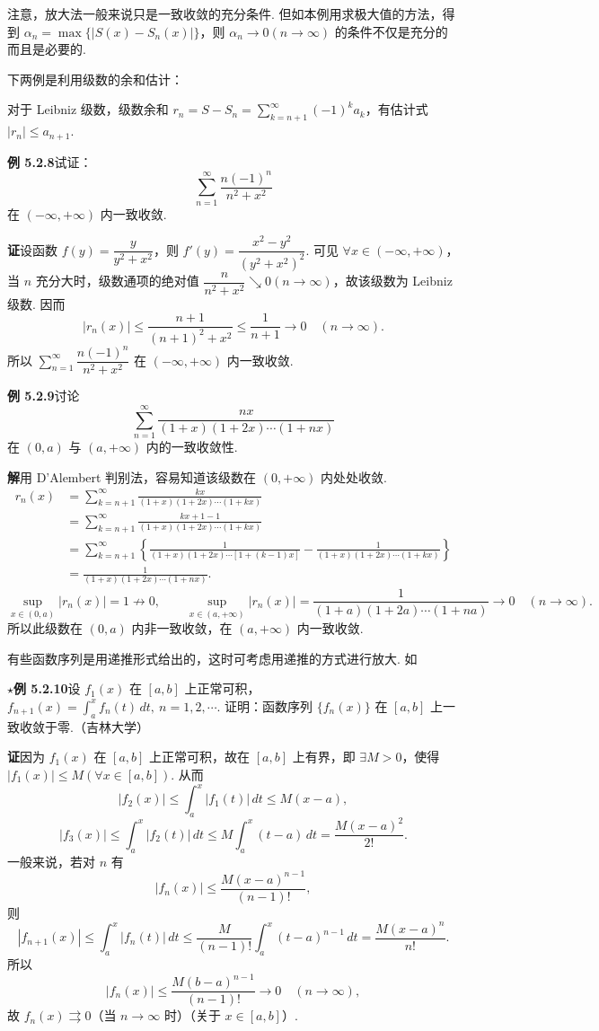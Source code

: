 \documentclass[UTF8,12pt,a4paper,fontset=fandol]{ctexart}
\begin{document}
注意，放大法一般来说只是一致收敛的充分条件. 但如本例用求极大值的方法，得到
$\alpha_n=\max\{|S(x)-S_n(x)|\}$，则 $\alpha_n\to0(n\to\infty)$ 的条件不仅是充分的而且是必要的.

下两例是利用级数的余和估计：

对于 Leibniz 级数，级数余和
$r_n=S-S_n=\displaystyle\sum_{k=n+1}^{\infty}(-1)^ka_k$，有估计式
$|r_n|\le a_{n+1}$.

\noindent\textbf{例 5.2.8}\quad 试证：
\[
  \sum_{n=1}^{\infty}\frac{n(-1)^n}{n^2+x^2}
\]
在 $(-\infty,+\infty)$ 内一致收敛.

\noindent\textbf{证}\quad 设函数 $f(y)=\dfrac{y}{y^2+x^2}$，则
$f'(y)=\dfrac{x^2-y^2}{(y^2+x^2)^2}$. 可见 $\forall x\in(-\infty,+\infty)$，当 $n$ 充分大时，级数通项的绝对值
$\dfrac{n}{n^2+x^2}\searrow0(n\to\infty)$，故该级数为 Leibniz 级数. 因而
\[
  |r_n(x)|\le\frac{n+1}{(n+1)^2+x^2}\le\frac1{n+1}\to0\quad(n\to\infty).
\]
所以 $\displaystyle\sum_{n=1}^{\infty}\dfrac{n(-1)^n}{n^2+x^2}$ 在
$(-\infty,+\infty)$ 内一致收敛.

\noindent\textbf{例 5.2.9}\quad 讨论
\[
  \sum_{n=1}^{\infty}\frac{nx}{(1+x)(1+2x)\cdots(1+nx)}
\]
在 $(0,a)$ 与 $(a,+\infty)$ 内的一致收敛性.

\noindent\textbf{解}\quad 用 D'Alembert 判别法，容易知道该级数在 $(0,+\infty)$ 内处处收敛.
\[
\begin{aligned}
r_n(x)
&=\sum_{k=n+1}^{\infty}\frac{kx}{(1+x)(1+2x)\cdots(1+kx)}\\
&=\sum_{k=n+1}^{\infty}\frac{kx+1-1}{(1+x)(1+2x)\cdots(1+kx)}\\
&=\sum_{k=n+1}^{\infty}\left\{
\frac1{(1+x)(1+2x)\cdots[1+(k-1)x]}
-\frac1{(1+x)(1+2x)\cdots(1+kx)}
\right\}\\
&=\frac1{(1+x)(1+2x)\cdots(1+nx)}.
\end{aligned}
\]
\[
  \sup_{x\in(0,a)}|r_n(x)|=1\not\to0,\qquad
  \sup_{x\in(a,+\infty)}|r_n(x)|
  =\frac1{(1+a)(1+2a)\cdots(1+na)}\to0\quad(n\to\infty).
\]
所以此级数在 $(0,a)$ 内非一致收敛，在 $(a,+\infty)$ 内一致收敛.

有些函数序列是用递推形式给出的，这时可考虑用递推的方式进行放大. 如

\noindent\textbf{$\star$例 5.2.10}\quad 设 $f_1(x)$ 在 $[a,b]$ 上正常可积，
$f_{n+1}(x)=\displaystyle\int_a^x f_n(t)\,dt,\ n=1,2,\cdots$. 证明：函数序列
$\{f_n(x)\}$ 在 $[a,b]$ 上一致收敛于零.（吉林大学）

\noindent\textbf{证}\quad 因为 $f_1(x)$ 在 $[a,b]$ 上正常可积，故在 $[a,b]$ 上有界，即
$\exists M>0$，使得 $|f_1(x)|\le M(\forall x\in[a,b])$. 从而
\[
  |f_2(x)|\le\int_a^x|f_1(t)|\,dt\le M(x-a),
\]
\[
  |f_3(x)|\le\int_a^x|f_2(t)|\,dt
  \le M\int_a^x(t-a)\,dt=\frac{M(x-a)^2}{2!}.
\]
一般来说，若对 $n$ 有
\[
  |f_n(x)|\le\frac{M(x-a)^{n-1}}{(n-1)!},
\]
则
\[
  |f_{n+1}(x)|\le\int_a^x|f_n(t)|\,dt
  \le\frac{M}{(n-1)!}\int_a^x(t-a)^{n-1}\,dt
  =\frac{M(x-a)^n}{n!}.
\]
所以
\[
  |f_n(x)|\le\frac{M(b-a)^{n-1}}{(n-1)!}\to0\quad(n\to\infty),
\]
故 $f_n(x)\rightrightarrows0$（当 $n\to\infty$ 时）（关于 $x\in[a,b]$）.
\end{document}
